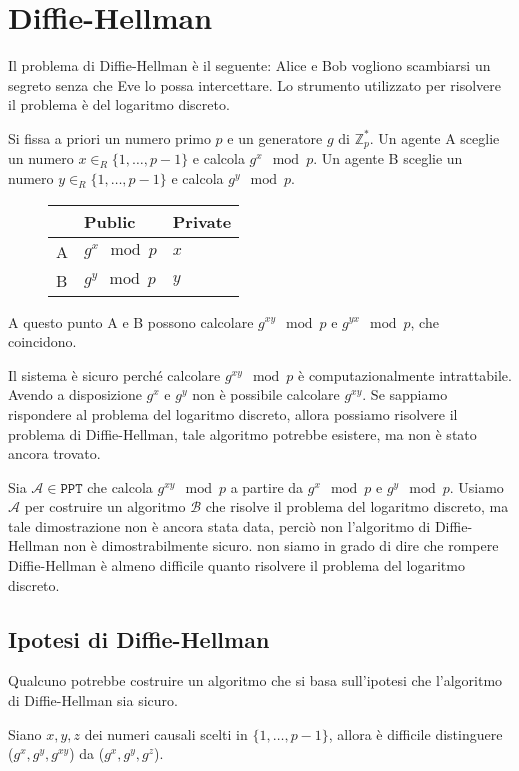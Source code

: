 \section{Diffie-Hellman}
Il problema di Diffie-Hellman è il seguente: Alice e Bob vogliono
scambiarsi un segreto senza che Eve lo possa intercettare. Lo strumento 
utilizzato per risolvere il problema è del logaritmo discreto.

Si fissa a priori un numero primo $p$ e un generatore $g$ di $\mathbb{Z}_p^*$.
Un agente A sceglie un numero $x \in_R \{1, \dots, p-1\}$ e calcola $g^x \mod p$. 
Un agente B sceglie un numero $y \in_R \{1, \dots, p-1\}$ e calcola $g^y \mod p$.

\begin{figure}[H]
    \centering
    \begin{tabular}[H]{l|l|l}
        & \textbf{Public} & \textbf{Private} \\
        \hline
        A & $g^x \mod p$ & $x$ \\
        \hline
        B & $g^y \mod p$ & $y$ \\
    \end{tabular}
\end{figure}

A questo punto A e B possono calcolare $g^{xy} \mod p$ e $g^{yx} \mod p$, che coincidono.

Il sistema è sicuro perché calcolare $g^{xy} \mod p$ è computazionalmente intrattabile. Avendo 
a disposizione $g^x$ e $g^y$ non è possibile calcolare $g^{xy}$. Se sappiamo rispondere al problema 
del logaritmo discreto, allora possiamo risolvere il problema di Diffie-Hellman, tale algoritmo 
potrebbe esistere, ma non è stato ancora trovato.

Sia $\mathcal{A} \in \texttt{PPT}$ che calcola $g^{xy} \mod p$ a partire da $g^x \mod p$ e $g^y \mod p$. 
Usiamo $\mathcal{A}$ per costruire un algoritmo $\mathcal{B}$ che risolve il problema del logaritmo discreto,
ma tale dimostrazione non è ancora stata data, perciò non l'algoritmo di Diffie-Hellman non è dimostrabilmente 
sicuro. non siamo in grado di dire che rompere Diffie-Hellman è almeno difficile quanto risolvere il problema
del logaritmo discreto.

\subsection{Ipotesi di Diffie-Hellman}
Qualcuno potrebbe costruire un algoritmo che si basa sull'ipotesi che l'algoritmo di Diffie-Hellman sia sicuro.
\begin{tcolorbox}[title = Ipotesi di Diffie-Hellman]
    Siano $x, y, z$ dei numeri causali scelti in $\{1, \dots, p-1\}$, allora è difficile 
    distinguere ($g^x, g^y, g^{xy}$) da ($g^x, g^y, g^z$).
\end{tcolorbox}


